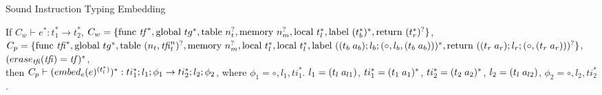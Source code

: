 \begin{lemma}{Sound Instruction Typing Embedding}

    If $C_w \vdash e^{*} : t_1^{*} \rightarrow t_2^{*}$,
    $C_w = \{
        \text{func } \tf^{*},
        \text{global } tg^{*},
        \text{table } n_t^{?},
        \text{memory } n_m^{?},
        \text{local } t_l^{*},
        \text{label } (t_b^{*})^{*},
        \text{return } (t_r^{*})^{?}
    \}$,
    $C_p = \{
        \text{func } \tfi^{*},
        \text{global } tg^{*},
        \text{table } (n_t,\tfi_t^n)^{?},
        \text{memory } n_m^{?}, \text{local } t_l^{*},
        \text{local } t_l^{*},
        \text{label } (\ti{t_b}{a_b};l_b;(\circ,l_b,\ti{t_b}{a_b}))^{*},
        \text{return } (\ti{t_r}{a_r};l_r;(\circ,\ti{t_r}{a_r}))^{?}
    \}$,
    $(\erase[\tfi]{\tfi} = \tf)^{*}$,
    \\ then $C_p \vdash (\embed[e]{e}^{(t_l^{*})})^{*} : ti_1^{*};l_1;\phi_1 \rightarrow ti_2^{*};l_2;\phi_2$, where
    $\phi_1 = \circ,l_1,ti_1^{*}$.
    $l_1 = \ti{t_l}{a_{l1}}$,
    $ti_1^{*} = \ti{t_1}{a_1}^{*}$,
    $ti_2^{*} = \ti{t_2}{a_2}^{*}$,
    $l_2 = \ti{t_l}{a_{l2}}$,
    $\phi_2 = \circ,l_2,ti_2^{*}$.
\end{lemma}
